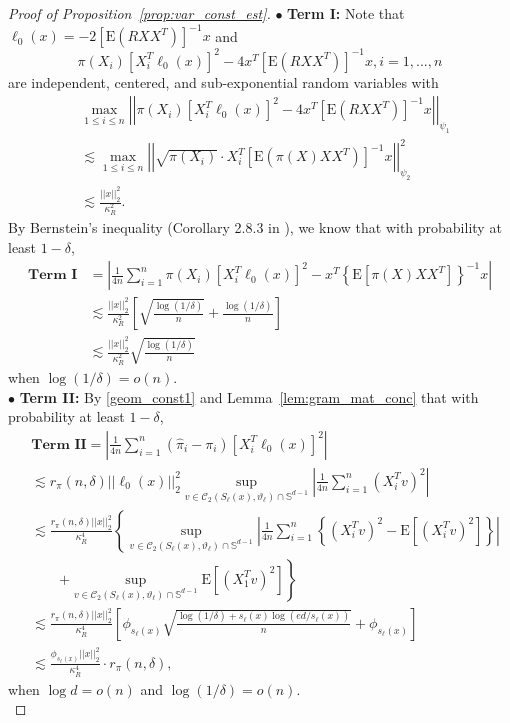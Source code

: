 \documentclass[ejsv2,noshowframe]{imsart}
\theoremstyle{plain}
\theoremstyle{definition}
\theoremstyle{remark}
\newcommand{\norm}[1]{\left|\left| #1 \right|\right|}
\renewcommand{\hat}{\widehat}
\begin{document}
\begin{proof}[Proof of Proposition~\ref{prop:var_const_est}]
	\noindent$\bullet$ \textbf{Term I:} Note that $\ell_0(x)=-2\left[\mathrm{E}\left(R XX^T\right)\right]^{-1}x$ and 
	$$\pi(X_i) \left[X_i^T\ell_0(x)\right]^2 - 4x^T\left[\mathrm{E}\left(RXX^T\right)\right]^{-1}x, i=1,...,n$$ 
	are independent, centered, and sub-exponential random variables with
	\begin{align*}
		&\max_{1\leq i \leq n} \norm{\pi(X_i)\left[X_i^T\ell_0(x)\right]^2 - 4x^T\left[\mathrm{E}\left(RXX^T\right)\right]^{-1}x}_{\psi_1}\\
		&\lesssim \max_{1\leq i \leq n}\norm{\sqrt{\pi(X_i)} \cdot X_i^T \left[\mathrm{E}\left(\pi(X)XX^T\right)\right]^{-1}x}_{\psi_2}^2\\
		&\lesssim \frac{\norm{x}_2^2}{\kappa_R^2}.
	\end{align*}
	By Bernstein's inequality (Corollary 2.8.3 in \citealt{vershynin2018high}), we know that with probability at least $1-\delta$,
	\begin{align*}
		\textbf{Term I} &=\left|\frac{1}{4n} \sum_{i=1}^n \pi(X_i) \left[X_i^T \ell_0(x)\right]^2 -x^T\left\{\mathrm{E}\left[\pi(X) XX^T\right]\right\}^{-1}x \right| \\
		&\lesssim \frac{\norm{x}_2^2}{\kappa_R^2} \left[\sqrt{\frac{\log(1/\delta)}{n}} + \frac{\log(1/\delta)}{n} \right]\\
		&\lesssim \frac{\norm{x}_2^2}{\kappa_R^2} \sqrt{\frac{\log(1/\delta)}{n}}
	\end{align*}
	when $\log(1/\delta)=o(n)$.\\
	
	\noindent$\bullet$ \textbf{Term II:} By \eqref{geom_const1} and Lemma~\ref{lem:gram_mat_conc} that with probability at least $1-\delta$,
	\begin{align*}
		&\textbf{Term II} = \left|\frac{1}{4n}\sum_{i=1}^n \left(\hat{\pi}_i -\pi_i\right)\left[X_i^T\ell_0(x)\right]^2\right| \\
		&\lesssim r_{\pi}(n,\delta) \norm{\ell_0(x)}_2^2 \sup_{v\in \mathcal{C}_2(S_{\ell}(x),\vartheta_{\ell})\cap \mathbb{S}^{d-1}} \left|\frac{1}{4n}\sum_{i=1}^n \left(X_i^Tv\right)^2\right|\\
		&\lesssim \frac{r_{\pi}(n,\delta)\norm{x}_2^2}{\kappa_R^4} \left\{\sup_{v \in \mathcal{C}_2(S_{\ell}(x),\vartheta_{\ell})\cap \mathbb{S}^{d-1}}\left|\frac{1}{4n}\sum_{i=1}^n \left\{\left(X_i^Tv\right)^2 - \mathrm{E}\left[(X_i^Tv)^2\right]\right\}\right| \right.\\
		&\quad\quad \left.+ \sup_{v \in \mathcal{C}_2(S_{\ell}(x),\vartheta_{\ell})\cap \mathbb{S}^{d-1}} \mathrm{E}\left[(X_1^Tv)^2\right] \right\}\\
		&\lesssim \frac{r_{\pi}(n,\delta)\norm{x}_2^2}{\kappa_R^4} \left[\phi_{s_{\ell}(x)} \sqrt{\frac{\log(1/\delta) + s_{\ell}(x)\log(ed/s_{\ell}(x))}{n}} + \phi_{s_{\ell}(x)} \right]\\
		&\lesssim \frac{\phi_{s_{\ell}(x)}\norm{x}_2^2}{\kappa_R^4} \cdot r_{\pi}(n,\delta),
	\end{align*}
	when $\log d=o(n)$ and $\log(1/\delta)=o(n)$.\\
	

\end{proof}
\end{document}
